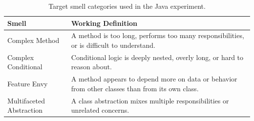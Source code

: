 \begin{table}[H]
\centering
\small
\begin{tabular}{@{}lP{0.66\textwidth}@{}}
\toprule
Smell & Working Definition \\
\midrule
Complex Method & A method is too long, performs too many responsibilities, or is difficult to understand. \\
Complex Conditional & Conditional logic is deeply nested, overly long, or hard to reason about. \\
Feature Envy & A method appears to depend more on data or behavior from other classes than from its own class. \\
Multifaceted Abstraction & A class abstraction mixes multiple responsibilities or unrelated concerns. \\
\bottomrule
\end{tabular}
\caption{Target smell categories used in the Java experiment.}
\label{tab:smell-definitions}
\end{table}
